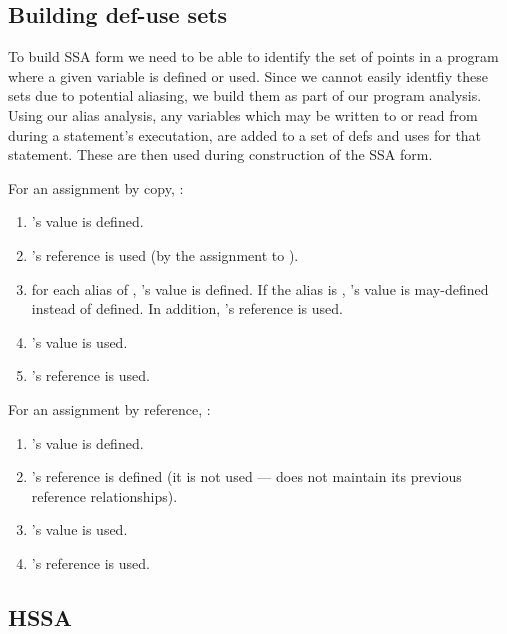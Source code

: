 \subsection{Building def-use sets}

To build SSA form we need to be able to identify the set of points in
a program where a given variable is defined or used. Since we cannot
easily identfiy these sets due to potential aliasing, we build them as
part of our program analysis.  Using our alias analysis, any variables
which may be written to or read from during a statement's executation,
are added to a set of defs and uses for that statement.  These are
then used during construction of the SSA form.

For an assignment by copy, :

\begin{enumerate}
	\item
		's value is defined.
	\item
		's reference is used (by the assignment to ).
	\item
		for each alias  of , 's
                value is defined.  If the alias is ,
                's value is may-defined instead of defined.
                In addition, 's reference is used.
	\item
		's value is used.
	\item
		's reference is used.

\end{enumerate}

For an assignment by reference, :

\begin{enumerate}
	\item
		's value is defined.
	\item
		's reference is defined (it is not
                used ---  does not maintain its previous
                reference relationships).

	\item
		's value is used.

	\item
		's reference is used.

\end{enumerate}



\subsection{HSSA}

